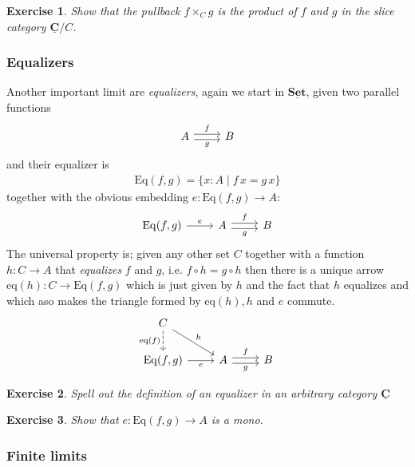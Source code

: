 \documentclass{article}
\newcommand{\cat}[1]{\underline{\mathbf{#1}}}
\newcommand{\Eq}[2]{\mathrm{Eq}(#1,#2)}
\newcommand{\eq}[1]{\mathrm{eq}(#1)}
\newtheorem{exercise}{Exercise}
\begin{document}
\begin{exercise}
  Show that the pullback $f \times_C g$ is the product of $f$ and $g$ in the slice category $\cat{C}/C$.
\end{exercise}

\subsubsection*{Equalizers}
\label{sec:equalizers}

Another important limit are \emph{equalizers}, again we start in $\cat{Set}$, given two parallel functions
\[\begin{tikzcd}
  A \arrow[r,"f",shift left] \arrow[r,"g" below,shift right]& B 
\end{tikzcd}\]
and their equalizer is 
\begin{align*}
\Eq{f}{g}  = \{ x : A \mid f\,x = g\,x \}
\end{align*}
together with the obvious embedding $e : \Eq{f}{g} \to A$:
\[\begin{tikzcd}
  \Eq{f}{g} \arrow[r,"e"] & A \arrow[r,"f",shift left] \arrow[r,"g" below,shift right]& B 
\end{tikzcd}\]
The universal property is; given any other set $C$ together with a function $h : C \to A$ that \emph{equalizes} $f$ and $g$, i.e. $f \circ h = g \circ h$ then there is a unique arrow $\eq{h} : C \to \Eq{f}{g}$ which is just given by $h$ and the fact that $h$ equalizes and which aso makes the triangle formed by $\eq{h},h$ and $e$ commute.
\[\begin{tikzcd}
    C \arrow[dr,"h"] \arrow[d, dashrightarrow,"\eq{f}" left] \\
  \Eq{f}{g} \arrow[r,"e" below] & A \arrow[r,"f",shift left] \arrow[r,"g" below,shift right]& B 
\end{tikzcd}\]

\begin{exercise}
  Spell out the definition of an equalizer in an arbitrary category $\cat{C}$
\end{exercise}

\begin{exercise}
  Show that  $e : \Eq{f}{g} \to A$ is a mono.
\end{exercise}

\subsubsection*{Finite limits}
\label{sec:finite-limits}
\end{document}
